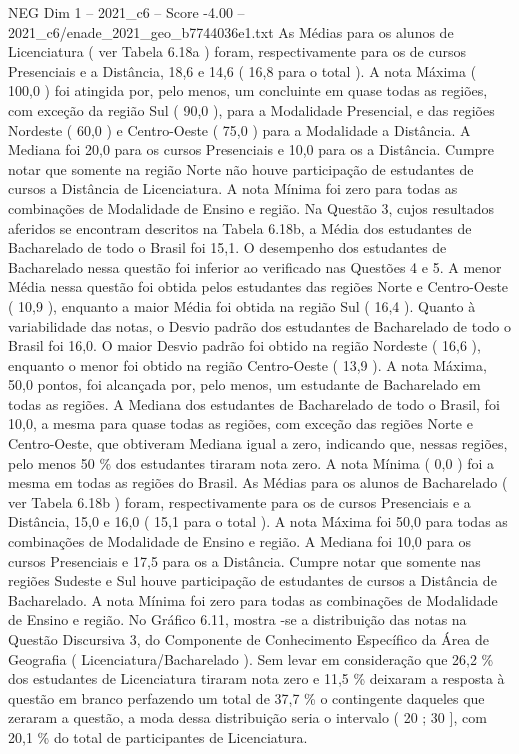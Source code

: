 \begin{textsample}{NEG Dim 1 – 2021\_c6 – Score -4.00 – 2021\_c6/enade\_2021\_geo\_b7744036e1.txt}
As Médias para os alunos de Licenciatura ( ver Tabela 6.18a ) foram, respectivamente para os de cursos Presenciais e a Distância, 18,6 e 14,6 ( 16,8 para o total ).
A nota Máxima ( 100,0 ) foi atingida por, pelo menos, um concluinte em quase todas as regiões, com exceção da região Sul ( 90,0 ), para a Modalidade Presencial, e das regiões Nordeste ( 60,0 ) e Centro-Oeste ( 75,0 ) para a Modalidade a Distância.
A Mediana foi 20,0 para os cursos Presenciais e 10,0 para os a Distância.
Cumpre notar que somente na região Norte não houve participação de estudantes de cursos a Distância de Licenciatura.
A nota Mínima foi zero para todas as combinações de Modalidade de Ensino e região.
Na Questão 3, cujos resultados aferidos se encontram descritos na Tabela 6.18b, a Média dos estudantes de Bacharelado de todo o Brasil foi 15,1.
O desempenho dos estudantes de Bacharelado nessa questão foi inferior ao verificado nas Questões 4 e 5.
A menor Média nessa questão foi obtida pelos estudantes das regiões Norte e Centro-Oeste ( 10,9 ), enquanto a maior Média foi obtida na região Sul ( 16,4 ).
Quanto à variabilidade das notas, o Desvio padrão dos estudantes de Bacharelado de todo o Brasil foi 16,0.
O maior Desvio padrão foi obtido na região Nordeste ( 16,6 ), enquanto o menor foi obtido na região Centro-Oeste ( 13,9 ).
A nota Máxima, 50,0 pontos, foi alcançada por, pelo menos, um estudante de Bacharelado em todas as regiões.
A Mediana dos estudantes de Bacharelado de todo o Brasil, foi 10,0, a mesma para quase todas as regiões, com exceção das regiões Norte e Centro-Oeste, que obtiveram Mediana igual a zero, indicando que, nessas regiões, pelo menos 50 \% dos estudantes tiraram nota zero.
A nota Mínima ( 0,0 ) foi a mesma em todas as regiões do Brasil.
As Médias para os alunos de Bacharelado ( ver Tabela 6.18b ) foram, respectivamente para os de cursos Presenciais e a Distância, 15,0 e 16,0 ( 15,1 para o total ).
A nota Máxima foi 50,0 para todas as combinações de Modalidade de Ensino e região.
A Mediana foi 10,0 para os cursos Presenciais e 17,5 para os a Distância.
Cumpre notar que somente nas regiões Sudeste e Sul houve participação de estudantes de cursos a Distância de Bacharelado.
A nota Mínima foi zero para todas as combinações de Modalidade de Ensino e região.
No Gráfico 6.11, mostra -se a distribuição das notas na Questão Discursiva 3, do Componente de Conhecimento Específico da Área de Geografia ( Licenciatura/Bacharelado ).
Sem levar em consideração que 26,2 \% dos estudantes de Licenciatura tiraram nota zero e 11,5 \% deixaram a resposta à questão em branco perfazendo um total de 37,7 \% o contingente daqueles que zeraram a questão, a moda dessa distribuição seria o intervalo ( 20 ; 30 ], com 20,1 \% do total de participantes de Licenciatura.

\end{textsample}
